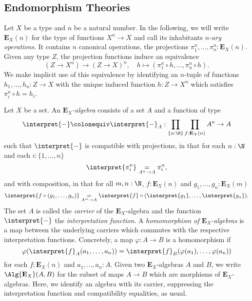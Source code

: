 {
\newcommand{\EE}{\mathbf{E}}
\newcommand{\ev}{\operatorname{\mathrm{ev}}}
\newcommand{\Trunc}[2][]{\lVert{#2}\rVert_{#1}}
\newcommand{\quotient}[2]{{#1}/{#2}}

\subsection{Endomorphism Theories}

Let \(X\) be a type and \(n\) be a natural number.
In the following, we will write \(\EE_X(n)\) for the type of functions \(X^n\to X\) and call its inhabitants \emph{\(n\)-ary operations}.
It contains \(n\) canonical operations, the projections \(\pi^n_1,\dots,\pi^n_n : \EE_X(n)\).
Given any type \(Z\), the projection functions induce an equivalence
\[
  (Z \to X^n) \to (Z\to X)^n, \quad h \mapsto (\pi^n_1\circ h,\dots,\pi^n_n\circ h).
\]
We make implicit use of this equivalence by identifying an \(n\)-tuple of functions \(h_1,\dots,h_n:Z\to X\) with the unique induced function \(h : Z\to X^n\) which satisfies \(\pi^n_i \circ h = h_i\).

\begin{definition}
  Let \(X\) be a set.
  An \emph{\(\EE_X\)-algebra} consists of a set \(A\) and a function of type
  \[
    \interpret{-}\colonequiv\interpret{-}_A : \prod_{\{n:\N\}}\prod_{f:\EE_X(n)} A^n \to A
  \]
  such that \(\interpret{-}\) is compatible with projections, in that
  for each \(n:\N\) and each \(i : \{1,\dots,n\}\)
  \[\interpret{\pi^n_i} \underset{A^n \to A}{=} \pi^n_i,\]
  and with composition, in that for all \(m,n:\N\), \(f:\EE_X(n)\) and \(g_1,\dots,g_n : \EE_X(m)\)
  \[\interpret{f\circ (g_1,\dots,g_n)} \underset{A^m \to A}{=} \interpret{f}\circ (\interpret{g_1},\dots,\interpret{g_n}).\]
  The set \(A\) is called the \emph{carrier} of the \(\EE_X\)-algebra and the function \(\interpret{-}\) the \emph{interpretation function}.
  A \emph{homomorphism of \(\EE_X\)-algebras} is a map between the underlying carriers which commutes with the respective interpretation functions.
  Concretely, a map \(\varphi : A \to B\) is a homomorphism if
  \[
    \varphi(\interpret{f}_A(a_1,\dots,a_n)) = \interpret{f}_B(\varphi(a_1),\dots,\varphi(a_n))
  \]
  for each \(f:\EE_X(n)\) and \(a_1,\dots,a_n : A\).
  Given two \(\EE_X\)-algebras \(A\) and \(B\), we write \(\Alg{\EE_X}(A,B)\) for the subset of maps \(A\to B\) which are morphisms of \(\EE_X\)-algebras.
  Here, we identify an algebra with its carrier, suppressing the interpretation function and compatibility equalities, as usual.
\end{definition}

}
